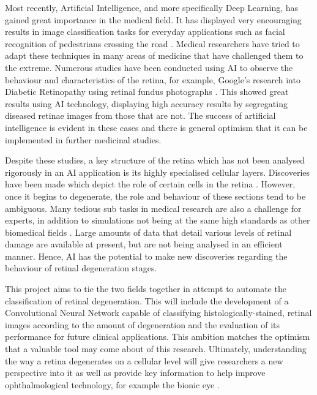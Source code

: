 \documentclass[a4paper]{article}
\begin{document}
Most recently, Artificial Intelligence, and more specifically Deep Learning, has gained great importance in the medical field. It has displayed very encouraging results in image classification tasks for everyday applications such as facial recognition of pedestrians crossing the road \cite{RN3}. Medical researchers have tried to adapt these techniques in many areas of medicine that have challenged them to the extreme. Numerous studies have been conducted using AI to observe the behaviour and characteristics of the retina, for example, Google's research into Diabetic Retinopathy using retinal fundus photographs \cite{RN6}. This showed great results using AI technology, displaying high accuracy results by segregating diseased retinae images from those that are not. The success of artificial intelligence is evident in these cases and there is general optimism that it can be implemented in further medicinal studies.\vspace{3mm}

Despite these studies, a key structure of the retina which has not been analysed rigorously in an AI application is its highly specialised cellular layers. Discoveries have been made which depict the role of certain cells in the retina \cite{RN4}. However, once it begins to degenerate, the role and behaviour of these sections tend to be ambiguous. Many tedious sub tasks in medical research are also a challenge for experts, in addition to simulations not being at the same high standards as other biomedical fields \cite{RN5}. Large amounts of data that detail various levels of retinal damage are available at present, but are not being analysed in an efficient manner. Hence, AI has the potential to make new discoveries regarding the behaviour of retinal degeneration stages.\vspace{3mm}

This project aims to tie the two fields together in attempt to automate the classification of retinal degeneration. This will include the development of a Convolutional Neural Network capable of classifying histologically-stained, retinal images according to the amount of degeneration and the evaluation of its performance for future clinical applications. This ambition matches the optimism that a valuable tool may come about of this research. Ultimately, understanding the way a retina degenerates on a cellular level will give researchers a new perspective into it as well as provide key information to help improve ophthalmological technology, for example the bionic eye \cite{RN24}.
\pagebreak
\end{document}
